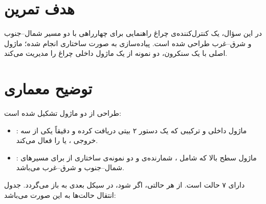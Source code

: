 
\section{هدف تمرین}
در این سؤال، یک کنترل‌کننده‌ی چراغ راهنمایی برای چهارراهی با دو مسیر شمال–جنوب و شرق–غرب طراحی شده است. پیاده‌سازی به صورت ساختاری انجام شده؛ ماژول اصلی با یک  سنکرون، دو نمونه از یک ماژول داخلی چراغ را مدیریت می‌کند.

\section{توضیح معماری}

طراحی از دو ماژول تشکیل شده است:

\begin{itemize}
    \item {}: ماژول داخلی و ترکیبی که یک دستور ۲ بیتی دریافت کرده و دقیقاً یکی از سه خروجی ،  یا  را فعال می‌کند.
    \item {}: ماژول سطح بالا که شامل ، شمارنده‌ی  و دو نمونه‌ی ساختاری از  برای مسیرهای شمال–جنوب و شرق–غرب می‌باشد.
\end{itemize}

 دارای ۷ حالت است. از هر حالتی، اگر  شود،  در سیکل بعدی به  باز می‌گردد. جدول انتقال حالت‌ها به این صورت می‌باشد:

